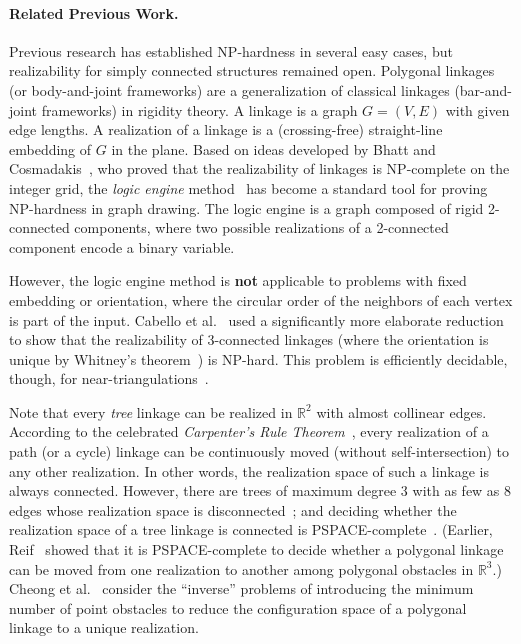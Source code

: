 \documentclass[runningheads]{article}
\newcommand{\RR}{\mathbb{R}} %
\begin{document}

\paragraph{Related Previous Work.}
Previous research has established NP-hardness in several easy cases, but realizability for simply connected structures remained open. Polygonal linkages (or body-and-joint frameworks) are a generalization of classical linkages (bar-and-joint frameworks) in rigidity theory. A linkage is a graph $G=(V,E)$ with given edge lengths. A realization of a linkage is a (crossing-free) straight-line embedding of $G$ in the plane. Based on ideas developed by Bhatt and Cosmadakis~\cite{BC87}, who proved that the realizability of linkages is NP-complete on the integer grid, the \emph{logic engine} method~\cite{BET+99,EW96,FHW97,HK01} has become a standard tool for proving NP-hardness in graph drawing. The logic engine is a graph composed of rigid 2-connected components, where two possible realizations of a 2-connected component encode a binary variable.

However, the logic engine method is \textbf{not} applicable to problems with fixed embedding or orientation, where the circular order of the neighbors of each vertex is part of the input. Cabello et al.~\cite{CDR07,EW90} used a significantly more elaborate reduction to show that the realizability of 3-connected linkages (where the orientation is unique by Whitney's theorem~\cite{W33}) is NP-hard. This problem is efficiently decidable, though, for near-triangulations~\cite{CDR07,BV96}.

Note that every \emph{tree} linkage can be realized in $\RR^2$ with almost collinear edges. According to the celebrated \emph{Carpenter's Rule Theorem}~\cite{CDR03,Str05}, every realization of a path (or a cycle) linkage can be continuously moved (without self-intersection) to any other realization. In other words, the realization space of such a linkage is always connected. However, there are trees of maximum degree 3 with as few as 8 edges whose realization space is disconnected~\cite{BCD+09}; and deciding whether the realization space of a tree linkage is connected is PSPACE-complete~\cite{AKR+04}.
(Earlier, Reif~\cite{Rei79} showed that it is PSPACE-complete to decide whether a polygonal linkage can be moved from one realization to another among polygonal obstacles in $\RR^3$.)
Cheong et al.~\cite{CdG+07} consider the ``inverse'' problems of introducing the minimum number of point obstacles to reduce the configuration space of a polygonal linkage to a unique realization.
\end{document}
